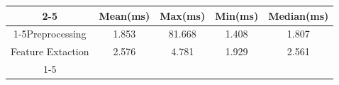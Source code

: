 \documentclass{standalone}
\begin{document}
 
 \begin{tabular}{|c |c |c |c |c |}
\cline{2-5}\cline{2-5} \multicolumn{1}{c |}{ } & Mean(ms) & Max(ms) & Min(ms) & Median(ms)\\ 
\cline{1-5}Preprocessing & 1.853 & 81.668 & 1.408 & 1.807\\ 
 \hhline{|=|=|=|=|=|}Feature Extaction & 2.576 & 4.781 & 1.929 & 2.561\\ 
 \cline{1-5}\hline \end{tabular}
 
\end{document}
